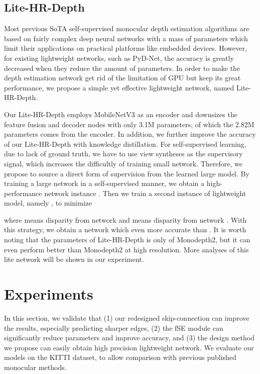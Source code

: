\documentclass[letterpaper]{article} \usepackage{aaai21}  \usepackage{times}  \usepackage{helvet} \usepackage{courier}  \usepackage[hyphens]{url}  \usepackage{graphicx} \urlstyle{rm} \def\UrlFont{\rm}  \usepackage{natbib}  \usepackage{caption} \frenchspacing  \setlength{\pdfpagewidth}{8.5in}  \setlength{\pdfpageheight}{11in}  \usepackage{booktabs}
\begin{document}
\subsection{Lite-HR-Depth}
Most previous SoTA self-supervised monocular depth estimation algorithms are based on fairly complex deep neural networks with a mass of parameters which limit their
applications on practical platforms like embedded devices. However, for existing lightweight networks, such as PyD-Net\cite{poggi2018towards}, the accuracy is greatly decreased when they reduce the 
amount of parameters. In order to make the depth estimation network get rid of the limitation of GPU but keep its great performance, we propose a simple yet effective lightweight network, named Lite-HR-Depth. 

Our Lite-HR-Depth employs MobileNetV3 as an encoder and downsizes the feature fusion and decoder nodes with only 3.1M parameters, of which the 2.82M parameters comes from the encoder. In addition, we further
improve the accuracy of our Lite-HR-Depth with knowledge distillation\cite{hinton2015distilling}. For self-supervised learning, due to lack of ground truth, we have to use view syntheses as the supervisory signal, which increases
the difficultly of training small network. Therefore, we propose to source a direct form of supervision from the learned large model.
By training a large network in a self-supervised manner, we obtain a high-performance network instance . Then we train a second instance of lightweight model, namely , to minimize 

where  means disparity from network  and  means disparity from network . With this strategy, we obtain a network  
which even more accurate than . It is worth noting that the parameters of Lite-HR-Depth is only  of Monodepth2, but it can even perform better than Monodepth2 
at high resolution. More analyses of this lite network will be shown in our experiment.

\section{Experiments}
In this section, we validate that (1) our redesigned skip-connection can improve the results, especially predicting sharper edges, (2) the fSE module can significantly reduce parameters and improve accuracy, and
(3) the design method we propose can easily obtain high precision lightweight network. We evaluate our models on the KITTI dataset\cite{geiger2013vision}, to allow comparison with previous published monocular methods.
\end{document}
